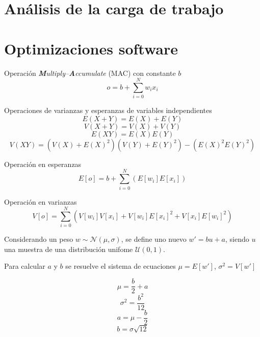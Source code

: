 \section{Análisis de la carga de trabajo}

\section{Optimizaciones software}
\todo

Operación \textit{\textbf{M}ultiply–\textbf{A}ccumulate} (MAC) con constante $b$
\begin{equation} \label{eq:mac}
o = b + \sum_{i=0}^N w_i x_i
\end{equation}

Operaciones de varianzas y esperanzas de variables independientes \todo
\begin{equation} \label{eq:neuron_variance}
E(X+Y) = E(X)+ E(Y)
\end{equation}
\begin{equation} \label{eq:neuron_variance}
V(X+Y) = V(X) + V(Y)
\end{equation}
\begin{equation} \label{eq:neuron_variance}
E(XY) = E(X)E(Y)
\end{equation}
\begin{equation} \label{eq:neuron_variance}
V(XY) = (V(X)+E(X)^2)(V(Y)+E(Y)^2) - (E(X)^2E(Y)^2)
\end{equation}

Operación en esperanzas
\begin{equation} \label{eq:neuron_expected}
E[o] = b + \sum_{i=0}^N ( E[w_i] E[x_i] )
\end{equation}

Operación en varianzas
\begin{equation} \label{eq:neuron_variance}
V[o] = \sum_{i=0}^N ( V[w_i]V[x_i] + V[w_i]E[x_i]^2 + V[x_i]E[w_i]^2 )
\end{equation}

Considerando un peso $w \sim \mathcal{N}(\mu,\sigma)$, se define uno nuevo $w' = b u + a$, siendo $u$ una muestra de una distribución unifome $\mathcal{U}(0,1)$. 

Para calcular $a$ y $b$ se resuelve el sistema de ecuaciones $\mu = E[w']$, $\sigma^2 = V[w']$

\begin{equation} \label{eq:neuron_variance}
\mu = \dfrac{b}{2} + a
\end{equation}
\begin{equation} \label{eq:neuron_variance}
\sigma^2 = \dfrac{b^2}{12}
\end{equation}
\begin{equation} \label{eq:system_a}
a = \mu - \dfrac{b}{2}
\end{equation}
\begin{equation} \label{eq:system_b}
b = \sigma \sqrt{12}
\end{equation}

